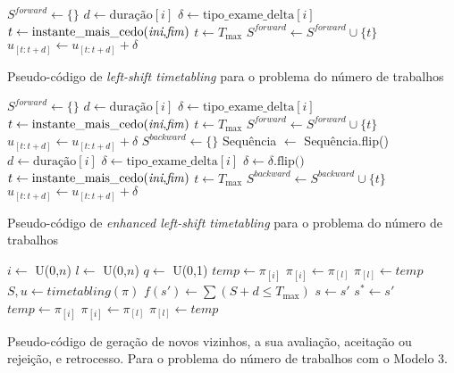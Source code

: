 \begin{algorithm}[H]
    $S^{\textit{forward}} \gets \{\}$\;
    {
        $d \gets \text{duração}[i]$\;
        $\delta \gets \text{tipo\_exame\_delta}[i]$\;
        $t \gets \text{instante\_mais\_cedo(\textit{ini},\textit{fim})}$\;
		{
			$t \gets T_{\max}$
		}
        $S^{\textit{forward}} \gets S^{\textit{forward}} \cup \{t\}$\;
        $u_{[t: t+d]} \gets u_{[t: t+d]} + \delta$\;
    }
    \caption{Pseudo-código de \textit{left-shift timetabling} para o problema do número de trabalhos}
    \label{algo:left-shift-TT_P2}
\end{algorithm}

\begin{algorithm}[H]
    $S^{\textit{forward}} \gets \{\}$\;
    {
        $d \gets \text{duração}[i]$\;
        $\delta \gets \text{tipo\_exame\_delta}[i]$\;
        $t \gets \text{instante\_mais\_cedo(\textit{ini},\textit{fim})}$\;
		{
			$t \gets T_{\max}$
		}
        $S^{\textit{forward}} \gets S^{\textit{forward}} \cup \{t\}$\;
        $u_{[t: t+d]} \gets u_{[t: t+d]} + \delta$\;
    }
    $S^{\textit{backward}} \gets \{\}$\;
    Sequência $\gets$ Sequência.flip()\;
	{
        $d \gets \text{duração}[i]$\;
        $\delta \gets \text{tipo\_exame\_delta}[i]$\;
        $\delta \gets \delta\text{.flip()}$\;
        $t \gets \text{instante\_mais\_cedo(\textit{ini},\textit{fim})}$\;
		{
			$t \gets T_{\max}$
		}
		        $S^{\textit{backward}} \gets S^{\textit{backward}} \cup \{t\}$\;
        $u_{[t: t+d]} \gets u_{[t: t+d]} + \delta$\;
    }
    \caption{Pseudo-código de \textit{enhanced left-shift timetabling} para o problema do número de trabalhos}
    \label{algo:enh-left-shift-TT_P2}
\end{algorithm}

\begin{algorithm}[H]
\label{algo:P2M2_GV_main_algo}
	$i \gets$ U(0,$n$)\;
	$l \gets$ U(0,$n$)\;
    $q \gets$ U(0,1)\;
    $\textit{temp} \gets \pi_{[i]}$\;
	$\pi_{[i]} \gets \pi_{[l]}$\;
	$\pi_{[l]} \gets \textit{temp}$\;
	$S, u \gets \textit{timetabling}(\pi)$\;
    $f(s') \gets \sum(S + d \leq T_{\max})$\;
	{
		$s \gets s'$\;
		{
			$s^* \gets s'$
		}
	}
	\Else
	{
    	$\textit{temp} \gets \pi_{[i]}$\;
		$\pi_{[i]} \gets \pi_{[l]}$\;
		$\pi_{[l]} \gets \textit{temp}$\;
	}    
    \caption{Pseudo-código de geração de novos vizinhos, a sua avaliação, aceitação ou rejeição, e retrocesso. Para o problema do número de trabalhos com o Modelo 3.}
\end{algorithm}

